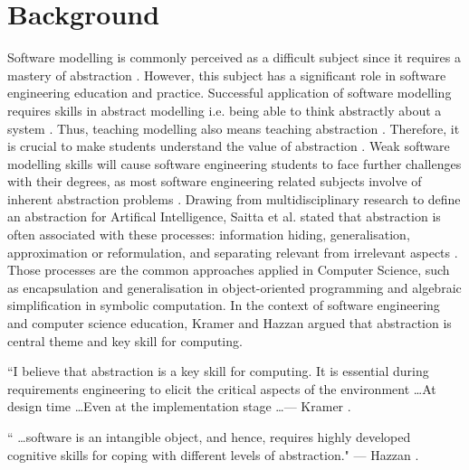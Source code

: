 \documentclass[10pt, a4paper]{report} \usepackage[titletoc]{appendix}
\begin{document}
\section{Background}
Software modelling is commonly perceived as a difficult subject since it
requires a mastery of abstraction \cite{Borstler2012}. However, this subject has a significant role in software engineering education and
practice. Successful application of software modelling requires skills in
abstract modelling \cite{whittle2013industrial}i.e. being able to think abstractly about a system \cite{bezivin2009teaching}. Thus, teaching modelling also means teaching abstraction \cite{engels2005teaching}. Therefore, it is crucial to make students understand the value of abstraction \cite{bezivin2009teaching}. Weak software modelling skills will cause software engineering students to face further challenges with their degrees, as most software engineering related subjects involve of inherent abstraction problems \cite{Kramer2007}. Drawing from multidisciplinary research to define an abstraction for Artifical Intelligence, Saitta et al. stated that abstraction is often associated with these processes: information hiding, generalisation, approximation or reformulation, and separating relevant from irrelevant aspects \cite{Saitta2013}. Those processes are the common approaches applied in Computer Science, such as encapsulation and generalisation in object-oriented programming and algebraic simplification in symbolic computation. In the context of software engineering and computer science education, Kramer \cite{Kramer2007} and Hazzan \cite{hazzan2008reflections} argued that abstraction is central theme and key skill for computing.

\begin{displayquote}
``I believe that abstraction is a key skill for computing. It is essential
during requirements engineering to elicit the critical aspects of the 
environment \dots At design time \dots Even at the implementation stage
\dots --- Kramer \cite{Kramer2007}.
\end{displayquote}

\begin{displayquote}
`` \dots software is an intangible object, and hence, requires highly developed
cognitive skills for coping with different levels of abstraction." --- Hazzan
\cite{hazzan2008reflections}.
\end{displayquote}
\end{document}
